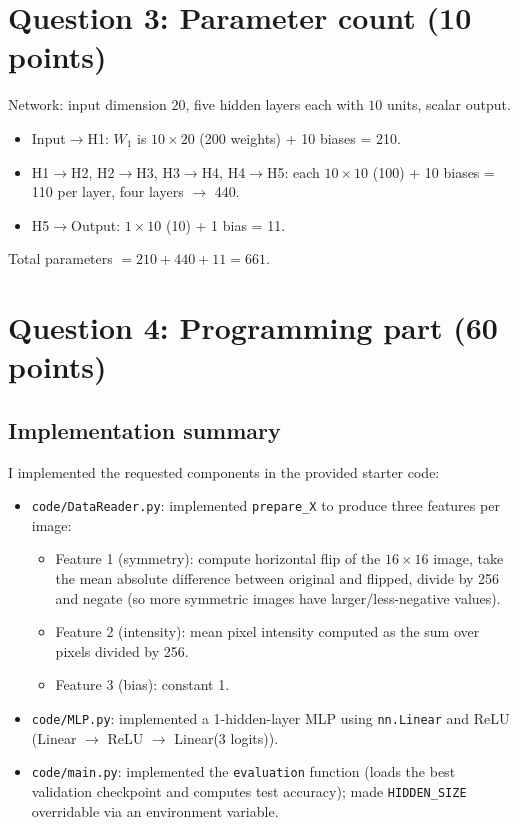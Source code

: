 \documentclass[12pt]{article}
\begin{document}
\section*{Question 3: Parameter count (10 points)}
Network: input dimension $20$, five hidden layers each with $10$ units, scalar output.
\begin{itemize}
  \item Input$\to$H1: $W_1$ is $10\times20$ (200 weights) + 10 biases = 210.
  \item H1$\to$H2, H2$\to$H3, H3$\to$H4, H4$\to$H5: each $10\times10$ (100) + 10 biases = 110 per layer, four layers $\to$ 440.
  \item H5$\to$Output: $1\times10$ (10) + 1 bias = 11.
\end{itemize}
Total parameters $=210 + 440 + 11 = 661$.

\section*{Question 4: Programming part (60 points)}
\subsection*{Implementation summary}
I implemented the requested components in the provided starter code:
\begin{itemize}
  \item \texttt{code/DataReader.py}: implemented \texttt{prepare\_X} to produce three features per image:
    \begin{itemize}
      \item Feature 1 (symmetry): compute horizontal flip of the $16\times16$ image, take the mean absolute difference between original and flipped, divide by 256 and negate (so more symmetric images have larger/less-negative values).
      \item Feature 2 (intensity): mean pixel intensity computed as the sum over pixels divided by 256.
      \item Feature 3 (bias): constant 1.
    \end{itemize}
  \item \texttt{code/MLP.py}: implemented a 1-hidden-layer MLP using \texttt{nn.Linear} and ReLU (Linear $\to$ ReLU $\to$ Linear(3 logits)).
  \item \texttt{code/main.py}: implemented the \texttt{evaluation} function (loads the best validation checkpoint and computes test accuracy); made \texttt{HIDDEN\_SIZE} overridable via an environment variable.
\end{itemize}
\end{document}
